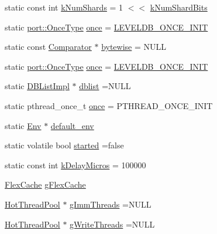 \begin{DoxyCompactItemize}
static const int \hyperlink{namespaceleveldb_aba1a810d4663b150df2768b04205f5ed}{k\+Num\+Shards} = 1 $<$$<$ \hyperlink{namespaceleveldb_ac3f66d6fb2271c29359e1cd233b1f8ca}{k\+Num\+Shard\+Bits}
\item 
static \hyperlink{namespaceleveldb_1_1port_a80651a8fb458d9b7b3c1f492f9abd055}{port\+::\+Once\+Type} \hyperlink{namespaceleveldb_aaca89bbfe8c9115ec6faaf59a77ca965}{once} = \hyperlink{port__posix_8h_aa0f16c685b4ebb93ccc49f5ae36e1c9d}{L\+E\+V\+E\+L\+D\+B\+\_\+\+O\+N\+C\+E\+\_\+\+I\+N\+I\+T}
\item 
static const \hyperlink{structleveldb_1_1_comparator}{Comparator} $\ast$ \hyperlink{namespaceleveldb_abacb49d42ee3c64ccbc0ce22391816d4}{bytewise} = N\+U\+L\+L
\item 
static \hyperlink{namespaceleveldb_1_1port_a80651a8fb458d9b7b3c1f492f9abd055}{port\+::\+Once\+Type} \hyperlink{namespaceleveldb_aaca89bbfe8c9115ec6faaf59a77ca965}{once} = \hyperlink{port__posix_8h_aa0f16c685b4ebb93ccc49f5ae36e1c9d}{L\+E\+V\+E\+L\+D\+B\+\_\+\+O\+N\+C\+E\+\_\+\+I\+N\+I\+T}
\item 
static \hyperlink{classleveldb_1_1_d_b_list_impl}{D\+B\+List\+Impl} $\ast$ \hyperlink{namespaceleveldb_a104dd68e027e61627f258f17081d6f38}{dblist} =N\+U\+L\+L
\item 
static pthread\+\_\+once\+\_\+t \hyperlink{namespaceleveldb_ae0ee2b9a8da60ad51918137eba9ffedb}{once} = P\+T\+H\+R\+E\+A\+D\+\_\+\+O\+N\+C\+E\+\_\+\+I\+N\+I\+T
\item 
static \hyperlink{classleveldb_1_1_env}{Env} $\ast$ \hyperlink{namespaceleveldb_a9ade93809ff59d5e6da0adc55c326a84}{default\+\_\+env}
\item 
static volatile bool \hyperlink{namespaceleveldb_a0e7f6672e194b1079b807f4fcf034599}{started} =false
\item 
static const int \hyperlink{namespaceleveldb_a5534e21c4b10affbe7390a9642ac0668}{k\+Delay\+Micros} = 100000
\item 
\hyperlink{classleveldb_1_1_flex_cache}{Flex\+Cache} \hyperlink{namespaceleveldb_a3c9ccbdb7bb66e9960b24c3e4a0f5b0d}{g\+Flex\+Cache}
\item 
\hyperlink{classleveldb_1_1_hot_thread_pool}{Hot\+Thread\+Pool} $\ast$ \hyperlink{namespaceleveldb_a1f4ec1a2203290cdf5dc08089e6ab3aa}{g\+Imm\+Threads} =N\+U\+L\+L
\item 
\hyperlink{classleveldb_1_1_hot_thread_pool}{Hot\+Thread\+Pool} $\ast$ \hyperlink{namespaceleveldb_af1ea4d410a9bc7416f346ba434c62e20}{g\+Write\+Threads} =N\+U\+L\+L
\item 
$$
\end{DoxyCompactItemize}
